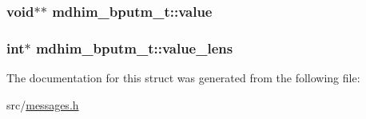 \hypertarget{structmdhim__bputm__t_a08c5296effa1522fee1cc7ca9b790575}{
\subsubsection[{value}]{\setlength{\rightskip}{0pt plus 5cm}void$\ast$$\ast$ mdhim\-\_\-bputm\-\_\-t\-::value}}\label{d1/ddf/structmdhim__bputm__t_a08c5296effa1522fee1cc7ca9b790575}
\hypertarget{structmdhim__bputm__t_a915478fbead386af153b4b3989ff7fb6}{
\subsubsection[{value\-\_\-lens}]{\setlength{\rightskip}{0pt plus 5cm}int$\ast$ mdhim\-\_\-bputm\-\_\-t\-::value\-\_\-lens}}\label{d1/ddf/structmdhim__bputm__t_a915478fbead386af153b4b3989ff7fb6}


The documentation for this struct was generated from the following file\-:\begin{DoxyCompactItemize}
\item 
src/\hyperlink{messages_8h}{messages.\-h}\end{DoxyCompactItemize}
